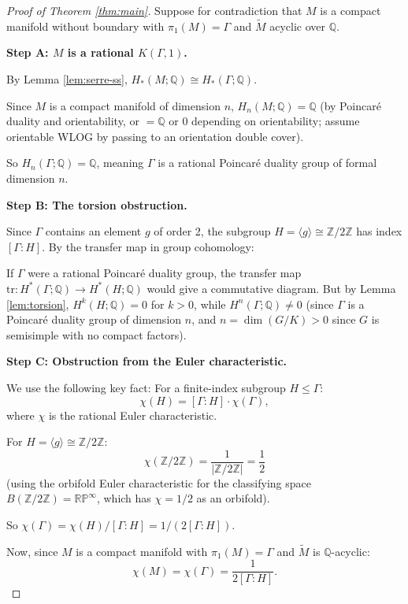 \documentclass[12pt]{article}
\begin{document}
\begin{proof}[Proof of Theorem \ref{thm:main}]
Suppose for contradiction that $M$ is a compact manifold without boundary with $\pi_1(M) = \Gamma$ and $\widetilde{M}$ acyclic over $\mathbb{Q}$.

\textbf{Step A: $M$ is a rational $K(\Gamma,1)$.}

By Lemma \ref{lem:serre-ss}, $H_*(M; \mathbb{Q}) \cong H_*(\Gamma; \mathbb{Q})$.

Since $M$ is a compact manifold of dimension $n$, $H_n(M; \mathbb{Q}) = \mathbb{Q}$ (by Poincar\'{e} duality and orientability, or $=\mathbb{Q}$ or $0$ depending on orientability; assume orientable WLOG by passing to an orientation double cover).

So $H_n(\Gamma; \mathbb{Q}) = \mathbb{Q}$, meaning $\Gamma$ is a rational Poincar\'{e} duality group of formal dimension $n$.

\textbf{Step B: The torsion obstruction.}

Since $\Gamma$ contains an element $g$ of order 2, the subgroup $H = \langle g \rangle \cong \mathbb{Z}/2\mathbb{Z}$ has index $[\Gamma : H]$. By the transfer map in group cohomology:

If $\Gamma$ were a rational Poincar\'{e} duality group, the transfer map $\mathrm{tr}: H^*(\Gamma; \mathbb{Q}) \to H^*(H; \mathbb{Q})$ would give a commutative diagram. But by Lemma \ref{lem:torsion}, $H^k(H; \mathbb{Q}) = 0$ for $k > 0$, while $H^n(\Gamma; \mathbb{Q}) \neq 0$ (since $\Gamma$ is a Poincar\'{e} duality group of dimension $n$, and $n = \dim(G/K) > 0$ since $G$ is semisimple with no compact factors).

\textbf{Step C: Obstruction from the Euler characteristic.}

We use the following key fact: For a finite-index subgroup $H \leq \Gamma$:
\[
\chi(H) = [\Gamma : H] \cdot \chi(\Gamma),
\]
where $\chi$ is the rational Euler characteristic.

For $H = \langle g \rangle \cong \mathbb{Z}/2\mathbb{Z}$:
\[
\chi(\mathbb{Z}/2\mathbb{Z}) = \frac{1}{|\mathbb{Z}/2\mathbb{Z}|} = \frac{1}{2}
\]
(using the orbifold Euler characteristic for the classifying space $B(\mathbb{Z}/2\mathbb{Z}) = \mathbb{RP}^\infty$, which has $\chi = 1/2$ as an orbifold).

So $\chi(\Gamma) = \chi(H) / [\Gamma : H] = 1 / (2[\Gamma:H])$.

Now, since $M$ is a compact manifold with $\pi_1(M) = \Gamma$ and $\widetilde{M}$ is $\mathbb{Q}$-acyclic:
\[
\chi(M) = \chi(\Gamma) = \frac{1}{2[\Gamma:H]}.
\]


\end{proof}
\end{document}
